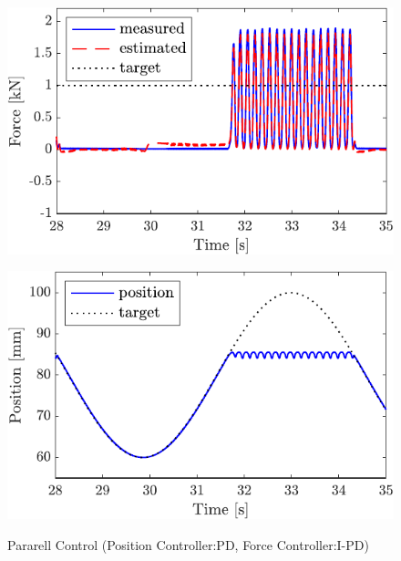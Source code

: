 \begin{figure}[t]
    \begin{minipage}{\minipageratio\hsize}
    \centering
        \includegraphics[keepaspectratio, scale = \minifigscale]{contents/IntegrationControl/figure/SECASQ/crop-FBsw_IPD_force.pdf}
        \label{fig5:crop-FBsw_IPD_force}
    \end{minipage}
    \begin{minipage}{\minipageratio\hsize}
    \centering
        \includegraphics[keepaspectratio, scale = \minifigscale]
        {contents/IntegrationControl/figure/SECASQ/crop-FBsw_IPD_pos.pdf}
        \label{fig5:crop-FBsw_IPD_pos}
    \end{minipage}
    \caption{Pararell Control (Position Controller:PD, Force Controller:I-PD)}
    \label{fig5:crop-FBsw_IPD}
\end{figure}

